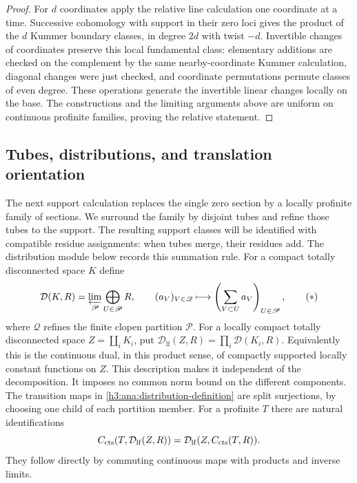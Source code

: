 \begin{proof}
For $d$ coordinates apply the relative line calculation one
coordinate at a time.  Successive cohomology with support in their
zero loci gives the product of the $d$ Kummer boundary classes,
in degree $2d$ with twist $-d$.  Invertible changes of coordinates
preserve this local fundamental class: elementary additions are
checked on the complement by the same nearby-coordinate Kummer
calculation, diagonal changes were just checked, and coordinate
permutations permute classes of even degree.  These operations
generate the invertible linear changes locally on the base.
The constructions and the limiting arguments above are uniform
on continuous profinite families, proving the relative statement.
\end{proof}

\subsection{Tubes, distributions, and translation orientation}

The next support calculation replaces the single zero section by a
locally profinite family of sections.  We surround the family by disjoint
tubes and refine those tubes to the support.  The resulting support
classes will be identified with compatible residue assignments: when
tubes merge, their residues add.  The distribution module below records
this summation rule.
For a compact totally disconnected space $K$ define
\[
 \mathcal D(K,R)=
 \varprojlim_{\mathscr P}\bigoplus_{U\in\mathscr P}R,
 \qquad
 (a_V)_{V\in\mathscr Q}\longmapsto
 \left(\sum_{V\subset U}a_V\right)_{U\in\mathscr P},
 \tag{$\ast$}\label{h3:ana:distribution-definition}
\]
where $\mathscr Q$ refines the finite clopen partition
$\mathscr P$.  For a locally compact totally disconnected space
$Z=\coprod_i K_i$, put
$\mathcal D_{\mathrm{lf}}(Z,R)=\prod_i\mathcal D(K_i,R)$.
Equivalently this is the continuous dual, in this product sense,
of compactly supported locally constant functions on $Z$.
This description makes it independent of the decomposition.
It imposes no common norm bound on the different components.
The transition maps in \eqref{h3:ana:distribution-definition} are
split surjections, by choosing one child of each partition member.
For a profinite $T$ there are natural identifications
\begin{equation}
 C_{\mathrm{cts}}(T,\mathcal D_{\mathrm{lf}}(Z,R))
 =\mathcal D_{\mathrm{lf}}(Z,C_{\mathrm{cts}}(T,R)).
 \label{h3:ana:distribution-parameters}
\end{equation}
They follow directly by commuting continuous maps with products
and inverse limits.

